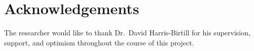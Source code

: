 


\chapter{Acknowledgements}

\label{chapter:ack}

The researcher would like to thank Dr.\ David Harris-Birtill for his supervision, support, and optimism throughout the course of this project.


